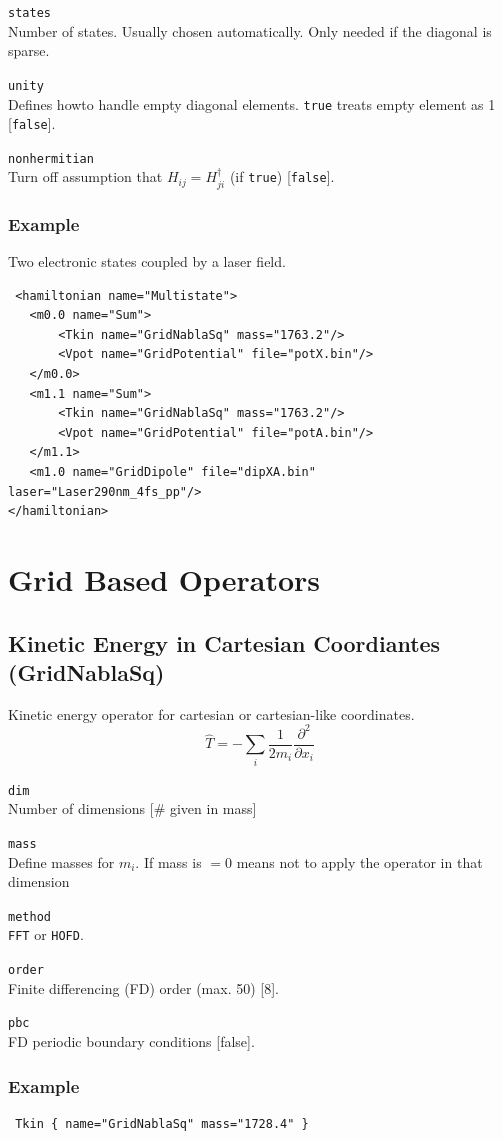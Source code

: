 \documentclass[a4paper,12pt]{scrbook}
\newcommand{\option}[2]{\item \texttt{#1}\\ #2}
\newcommand{\code}[1]{\texttt{#1}}
\begin{document}
\begin{options}
 \option{states}{Number of states. Usually chosen automatically. Only needed if the diagonal is sparse.}
 \option{unity}{Defines howto handle empty diagonal elements. \code{true} treats empty element as 1 [\code{false}].}
 \option{nonhermitian}{Turn off assumption that $H_{ij} = H_{ji}^\dagger$ (if \code{true}) [\code{false}].}
\end{options}


\subsubsection*{Example}
Two electronic states coupled by a laser field.
\begin{verbatim}
 <hamiltonian name="Multistate">
   <m0.0 name="Sum">
       <Tkin name="GridNablaSq" mass="1763.2"/>
       <Vpot name="GridPotential" file="potX.bin"/>
   </m0.0>
   <m1.1 name="Sum">
       <Tkin name="GridNablaSq" mass="1763.2"/>
       <Vpot name="GridPotential" file="potA.bin"/>
   </m1.1>
   <m1.0 name="GridDipole" file="dipXA.bin" laser="Laser290nm_4fs_pp"/>
</hamiltonian>
\end{verbatim}


\section{Grid Based Operators}

\subsection{Kinetic Energy in Cartesian Coordiantes (GridNablaSq)}
Kinetic energy operator for cartesian or cartesian-like coordinates.
\begin{equation}
 \hat T = -\sum_i \frac{1}{2m_i}\frac{\partial^2}{\partial x_i}
\end{equation}

\begin{options}
 \option{dim}{Number of dimensions [\# given in mass]}
 \option{mass}{Define masses for $m_i$. If mass is $= 0$ means not to apply the operator in that dimension}
 \option{method}{\code{FFT} or \code{HOFD}.}
 \option{order}{Finite differencing (FD) order (max. 50) [8].}
 \option{pbc}{FD periodic boundary conditions [false].}
\end{options}

\subsubsection*{Example}
\begin{verbatim}
 Tkin { name="GridNablaSq" mass="1728.4" }
\end{verbatim}
\end{document}
